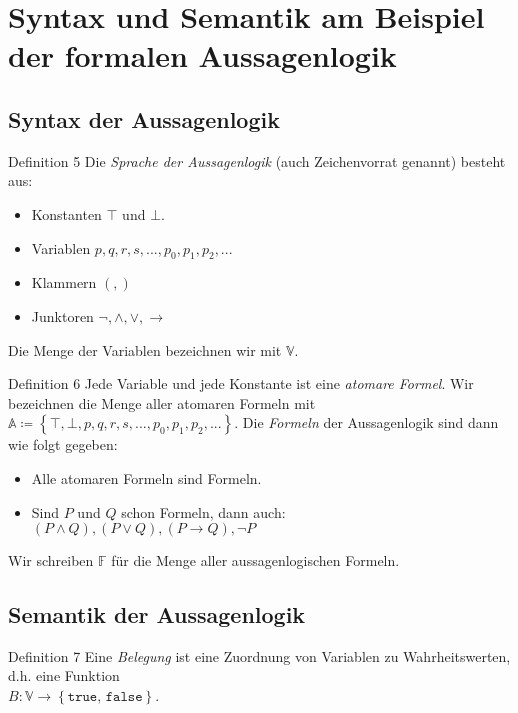 	\section{Syntax und Semantik am Beispiel der formalen Aussagenlogik}
	\subsection{Syntax der Aussagenlogik}
	\begin{definition}{Definition 5}
		Die \textit{Sprache der Aussagenlogik} (auch Zeichenvorrat genannt) besteht aus:
		\begin{itemize}
			\item Konstanten $\top$ und $\bot$.
			\item Variablen $p,q,r,s,...,p_0,p_1,p_2,...$
			\item Klammern $(,)$
			\item Junktoren $\neg,\land,\lor,\to$
		\end{itemize}
		Die Menge der Variablen bezeichnen wir mit $\mathbb{V}$.
	\end{definition}
	
	\begin{definition}{Definition 6}
		Jede Variable und jede Konstante ist eine \textit{atomare Formel}. Wir bezeichnen die Menge aller
		atomaren Formeln mit $\mathbb{A} \coloneqq \left\{\top,\bot,p,q,r,s,...,p_0,p_1,p_2,...\right\}$. Die
		\textit{Formeln} der Aussagenlogik sind dann wie folgt gegeben:
		\begin{itemize}
			\item Alle atomaren Formeln sind Formeln.
			\item Sind $P$ und $Q$ schon Formeln, dann auch: $(P\land Q),(P\lor Q),(P\to Q), \neg P$
		\end{itemize}
		Wir schreiben $\mathbb{F}$ für die Menge aller aussagenlogischen Formeln.	
	\end{definition}

	\subsection{Semantik der Aussagenlogik}
	\begin{definition}{Definition 7}
		Eine \textit{Belegung} ist eine Zuordnung von Variablen zu Wahrheitswerten, d.h. eine Funktion \\
		$B:\mathbb{V}\to \left\{\texttt{true, false}\right\}$.
	\end{definition}
	
